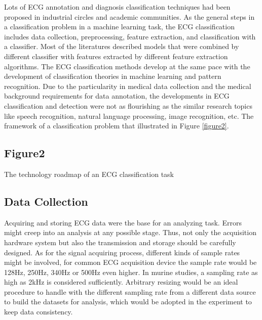 \documentclass{bmcart}
\begin{document}
Lots of ECG annotation and diagnosis classification techniques had been proposed in industrial circles and academic communities. As the general steps in a classification problem in a machine learning task, the ECG classification includes data collection, preprocessing, feature extraction, and classification with a classifier. Most of the literatures described models that were combined by different classifier with features extracted by different feature extraction algorithms. The ECG classification methods develop at the same pace with the development of classification theories in machine learning and pattern recognition. Due to the particularity in medical data collection and the medical background requirements for data annotation, the developments in ECG classification and detection were not as flourishing as the similar research topics like speech recognition, natural language processing, image recognition, etc. The framework of a classification problem that illustrated in Figure \ref{figure2}.


\subsection*{Figure2}

The technology roadmap of an ECG classification task

 




\subsection*{Data Collection}
Acquiring and storing ECG data were the base for an analyzing task. Errors might creep into an analysis at any possible stage. Thus, not only the acquisition hardware system but also the transmission and storage should be carefully designed. As for the signal acquiring process, different kinds of sample rates might be involved, for common ECG acquisition device the sample rate would be 128Hz, 250Hz, 340Hz or 500Hz even higher. In murine studies, a sampling rate as high as 2kHz is considered sufficiently. Arbitrary resizing would be an ideal procedure to handle with the different sampling rate from a different data source to build the datasets for analysis, which would be adopted in the experiment to keep data consistency.
\end{document}
